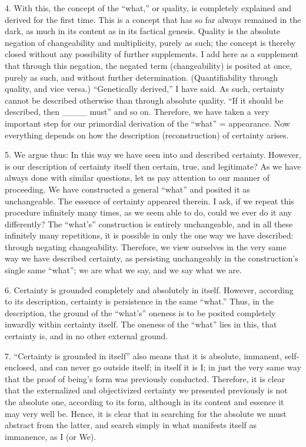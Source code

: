4. With this, the concept of the “what,” or quality,
is completely explained and derived for the first time.
This is a concept that has so far always remained in the dark,
as much in its content as in its factical genesis.
Quality is the absolute negation of
changeability and multiplicity, purely as such;
the concept is thereby closed without
any possibility of further supplements.
I add here as a supplement that through this negation,
the negated term (changeability) is posited at once,
purely as such, and without further determination.
(Quantifiability through quality, and vice versa.)
“Genetically derived,” I have said.
As such, certainty cannot be described otherwise
than through absolute quality.
“If it should be described, then ____ must” and so on.
Therefore, we have taken a very important step
for our primordial derivation of the “what” = appearance.
Now everything depends on how
the description (reconstruction) of certainty arises.

5. We argue thus:
In this way we have seen into and described certainty.
However, is our description of certainty itself then
certain, true, and legitimate?
As we have always done with similar questions,
let us pay attention to our manner of proceeding.
We have constructed a general “what”
and posited it as unchangeable.
The essence of certainty appeared therein.
I ask, if we repeat this procedure infinitely many times,
as we seem able to do, could we ever do it any differently?
The “what's” construction is entirely unchangeable,
and in all these infinitely many repetitions,
it is possible in only the one way we have described:
through negating changeability.
Therefore, we view ourselves in the very same way
we have described certainty, as persisting unchangeably
in the construction's single same “what”;
we are what we say, and we say what we are.

6. Certainty is grounded completely and absolutely in itself.
However, according to its description,
certainty is persistence in the same “what.”
Thus, in the description, the ground of the “what's” oneness is
to be posited completely inwardly within certainty itself.
The oneness of the “what” lies in this,
that certainty is,
and in no other external ground.

7. “Certainty is grounded in itself” also means
that it is absolute, immanent, self-enclosed,
and can never go outside itself;
in itself it is I;
in just the very same way that
the proof of being's form was previously conducted.
Therefore, it is clear that the externalized and objectivized
certainty we presented previously is not
the absolute one, according to its form,
although in its content and essence it may very well be.
Hence, it is clear that in searching for the absolute
we must abstract from the latter,
and search simply in what manifests
itself as immanence, as I (or We).

